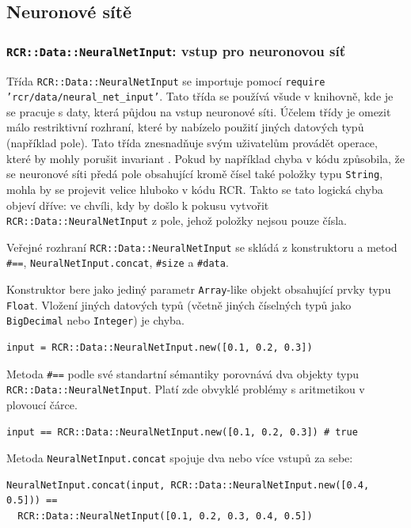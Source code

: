 \documentclass[a4paper]{article}
\begin{document}
\subsection{Neuronové sítě}
\subsubsection{\texttt{RCR::Data::NeuralNetInput}: vstup pro neuronovou síť}
Třída \texttt{RCR::Data::NeuralNetInput} se importuje pomocí \texttt{require
'rcr/data/neural\_net\_input'}. Tato třída se používá všude v knihovně, kde
je se pracuje s daty, která půjdou na vstup neuronové síti. Účelem třídy
je omezit málo restriktivní rozhraní, které by nabízelo použití jiných datových
typů (například pole). Tato třída znesnadňuje svým uživatelům provádět operace,
které by mohly porušit invariant .
Pokud by například chyba v kódu způsobila, že se neuronové síti předá pole
obsahující kromě čísel také položky typu \texttt{String}, mohla by se projevit
velice hluboko v kódu RCR. Takto se tato logická chyba objeví dříve: ve chvíli,
kdy by došlo k pokusu vytvořit \texttt{RCR::Data::NeuralNetInput} z pole,
jehož položky nejsou pouze čísla.

Veřejné rozhraní \texttt{RCR::Data::NeuralNetInput} se skládá z konstruktoru a
metod \texttt{\#==}, \texttt{NeuralNetInput.concat}, \texttt{\#size} a \texttt{\#data}.

Konstruktor bere jako jediný parametr \texttt{Array}-like objekt obsahující
prvky typu \texttt{Float}. Vložení jiných datových typů (včetně jiných číselných
typů jako \texttt{BigDecimal} nebo \texttt{Integer}) je chyba.
\begin{lstlisting}
input = RCR::Data::NeuralNetInput.new([0.1, 0.2, 0.3])
\end{lstlisting}

Metoda \texttt{\#==} podle své standartní sémantiky porovnává dva objekty typu
\texttt{RCR::Data::NeuralNetInput}. Platí zde obvyklé problémy s aritmetikou
v plovoucí čárce.
\begin{lstlisting}
input == RCR::Data::NeuralNetInput.new([0.1, 0.2, 0.3]) # true
\end{lstlisting}

Metoda \texttt{NeuralNetInput.concat} spojuje dva nebo více vstupů za sebe:
\begin{lstlisting}
NeuralNetInput.concat(input, RCR::Data::NeuralNetInput.new([0.4, 0.5])) ==
  RCR::Data::NeuralNetInput([0.1, 0.2, 0.3, 0.4, 0.5])
\end{lstlisting}
\end{document}
